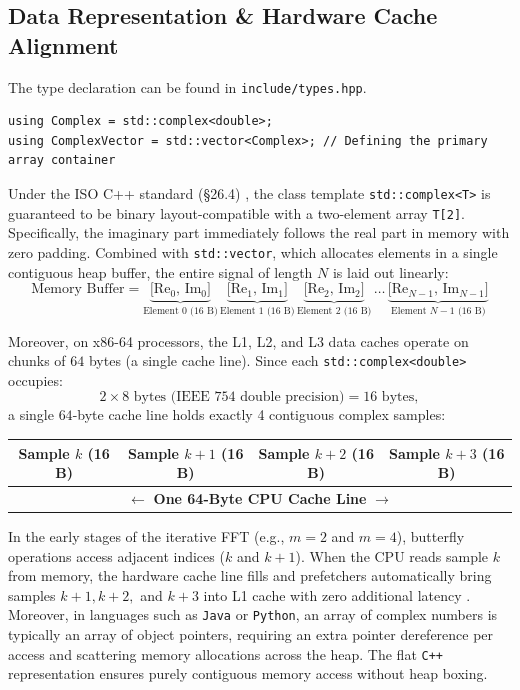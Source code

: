 \documentclass{article}
\begin{document}
\subsection{Data Representation \& Hardware Cache Alignment}
The type declaration can be found in \texttt{include/types.hpp}.
\begin{lstlisting}[style=latte-cpp]
using Complex = std::complex<double>;  
using ComplexVector = std::vector<Complex>; // Defining the primary array container
\end{lstlisting}
Under the ISO C++ standard (\S 26.4) \cite{isocpp20}, the class template \texttt{std::complex<T>} is guaranteed to be binary layout-compatible with a two-element array \texttt{T[2]}. Specifically, the imaginary part immediately follows the real part in memory with zero padding. Combined with \texttt{std::vector}, which allocates elements in a single contiguous heap buffer, the entire signal of length $N$ is laid out linearly:
\begin{equation}
\label{eq:memory_layout}
\text{Memory Buffer} = \underbrace{\big[ \text{Re}_0, \, \text{Im}_0 \big]}_{\text{Element } 0 \text{ (16 B)}} \, 
                       \underbrace{\big[ \text{Re}_1, \, \text{Im}_1 \big]}_{\text{Element } 1 \text{ (16 B)}} \, 
                       \underbrace{\big[ \text{Re}_2, \, \text{Im}_2 \big]}_{\text{Element } 2 \text{ (16 B)}} \, 
                       \dots \, 
                       \underbrace{\big[ \text{Re}_{N-1}, \, \text{Im}_{N-1} \big]}_{\text{Element } N-1 \text{ (16 B)}}
\end{equation}

Moreover, on x86-64 processors, the L1, L2, and L3 data caches operate on chunks of $64$ bytes (a single cache line). Since each \texttt{std::complex<double>} occupies:
\begin{equation}
2 \times 8\text{ bytes (IEEE 754 double precision)} = 16\text{ bytes},
\end{equation}
a single $64$-byte cache line holds exactly 4 contiguous complex samples:
\begin{center}
\begin{tabular}{|c|c|c|c|}
\hline
\textbf{Sample $k$} (16 B) & \textbf{Sample $k+1$} (16 B) & \textbf{Sample $k+2$} (16 B) & \textbf{Sample $k+3$} (16 B) \\
\hline
\multicolumn{4}{|c|}{$\longleftarrow$ \textbf{One 64-Byte CPU Cache Line} $\longrightarrow$} \\
\hline
\end{tabular}
\end{center}
In the early stages of the iterative FFT (e.g., $m = 2$ and $m = 4$), butterfly operations access adjacent indices ($k$ and $k+1$). When the CPU reads sample $k$ from memory, the hardware cache line fills and prefetchers automatically bring samples $k+1, k+2,$ and $k+3$ into L1 cache with zero additional latency \cite{drepper2007}. Moreover, in languages such as \texttt{Java} or \texttt{Python}, an array of complex numbers is typically an array of object pointers, requiring an extra pointer dereference per access and scattering memory allocations across the heap. The flat \texttt{C++} representation ensures purely contiguous memory access without heap boxing.
\end{document}
